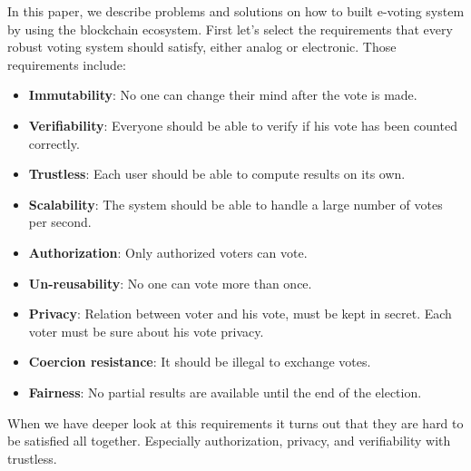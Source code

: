 \documentclass[runningheads]{llncs}
\begin{document}
In this paper, we describe problems and solutions on how to built e-voting system by 
using the  blockchain ecosystem. 
First let's select   the requirements that every robust voting system should satisfy, either analog or electronic. Those requirements include:
\begin{itemize}
\item \textbf{Immutability}: No one can change their mind after the vote is made.
\item \textbf{Verifiability}: Everyone should be able to verify if his vote has been counted correctly.
\item \textbf{Trustless}: Each user should be able to compute results on its own.
\item \textbf{Scalability}: The system should be able to handle a large number of votes per second.
\item \textbf{Authorization}: Only authorized voters can vote.
\item \textbf{Un-reusability}: No one can vote more than once.
\item \textbf{Privacy}: Relation between voter and his vote, must be kept in secret. Each voter must be sure about his vote privacy. 
\item \textbf{Coercion resistance}: It should be illegal to exchange votes.
\item \textbf{Fairness}: No partial results are available until the end of the election.
\end{itemize}

When we have deeper look at this requirements 
it turns out that they are hard to be satisfied all together. Especially authorization, privacy, and verifiability with trustless. 
\end{document}
